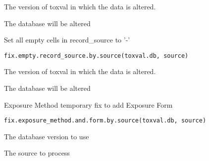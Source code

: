 \documentclass[letterpaper]{book}
\begin{document}
%
\begin{Arguments}
\begin{ldescription}
\item[\code{toxval.db}] The version of toxval in which the data is altered.
\end{ldescription}
\end{Arguments}
%
\begin{Value}
The database will be altered
\end{Value}
%
\begin{Description}\relax
Set all empty cells in record\_source to '-'
\end{Description}
%
\begin{Usage}
\begin{verbatim}
fix.empty.record_source.by.source(toxval.db, source)
\end{verbatim}
\end{Usage}
%
\begin{Arguments}
\begin{ldescription}
\item[\code{toxval.db}] The version of toxval in which the data is altered.
\end{ldescription}
\end{Arguments}
%
\begin{Value}
The database will be altered
\end{Value}
%
\begin{Description}\relax
Exposure Method temporary fix to add Exposure Form
\end{Description}
%
\begin{Usage}
\begin{verbatim}
fix.exposure_method.and.form.by.source(toxval.db, source)
\end{verbatim}
\end{Usage}
%
\begin{Arguments}
\begin{ldescription}
\item[\code{toxval.db}] The database version to use

\item[\code{source}] The source to process
\end{ldescription}
\end{Arguments}
\end{document}
